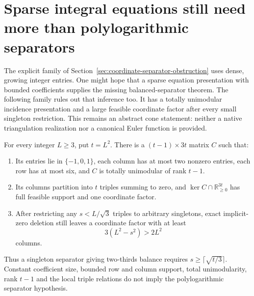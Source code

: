 \section{Sparse integral equations still need more than polylogarithmic separators}
\label{sec:sparse-coordinate-separators}

The explicit family of Section~\ref{sec:coordinate-separator-obstruction}
uses dense, growing integer entries.  One might hope that a sparse equation
presentation with bounded coefficients supplies the missing balanced-separator
theorem.  The following family rules out that inference too.  It has a
totally unimodular incidence presentation and a large feasible coordinate
factor after every small singleton restriction.  This remains an abstract
cone statement: neither a native triangulation realization nor a canonical
Euler function is provided.

\begin{proposition}
For every integer $L\ge3$, put $t=L^2$.  There is a
$(t-1)\times3t$ matrix $C$ such that:
\begin{enumerate}
\item Its entries lie in $\{-1,0,1\}$, each column has at most two nonzero
entries, each row has at most six, and $C$ is totally unimodular of rank $t-1$.
\item Its columns partition into $t$ triples summing to zero, and
$\ker C\cap\mathbb R_{\ge0}^{3t}$ has full feasible support and one
coordinate factor.
\item After restricting any $s<L/\sqrt3$ triples to arbitrary
singletons, exact implicit-zero deletion still leaves a coordinate factor
with at least
\[
                         3(L^2-s^2)>2L^2
\]
columns.
\end{enumerate}
Thus a singleton separator giving two-thirds balance requires
$s\ge\lceil\sqrt{t/3}\rceil$.  Constant coefficient size, bounded row and
column support, total unimodularity, rank $t-1$ and the local triple relations
do not imply the polylogarithmic separator hypothesis.
\end{proposition}

